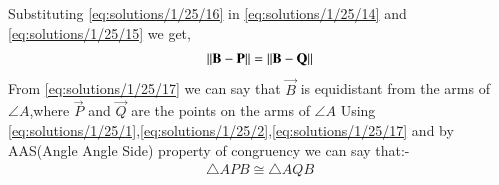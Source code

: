 Substituting \eqref{eq:solutions/1/25/16} in \eqref{eq:solutions/1/25/14} and \eqref{eq:solutions/1/25/15} we get,
\begin{align}
    \left\lVert\mathbf{B}-\mathbf{P}\right\rVert=\left\lVert\mathbf{B}-\mathbf{Q}\right\rVert\label{eq:solutions/1/25/17}
\end{align}
From \eqref{eq:solutions/1/25/17} we can say that $\vec{B}$ is equidistant from the arms of $\angle{A}$,where $\vec{P}$ and $\vec{Q}$ are the points on the arms of $\angle{A}$
Using \eqref{eq:solutions/1/25/1},\eqref{eq:solutions/1/25/2},\eqref{eq:solutions/1/25/17} and by AAS(Angle Angle Side) property of congruency we can say that:-\\
\begin{align}
\triangle APB \cong \triangle AQB
\end{align}
